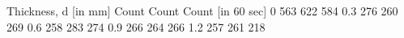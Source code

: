 Thickness, d [in mm]	Count	Count	Count [in 60 sec]
0			563	622	584
0.3			276	260	269
0.6			258	283	274
0.9			266	264	266
1.2			257	261	218
